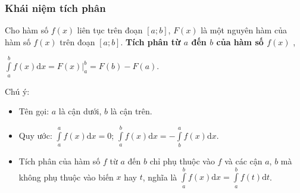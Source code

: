 \subsubsection{Khái niệm tích phân}
Cho hàm số $f(x)$ liên tục trên đoạn $\left[a;b\right]$, $F(x)$ là một nguyên hàm của hàm số $f(x)$ trên đoạn $\left[a;b\right]$. 
\textbf{\boldmath Tích phân từ $a$ đến $b$ của hàm số $f(x)$ \unboldmath},
\begin{center}
	$\displaystyle\int\limits_a^bf(x)\mathrm{d}x= F(x)\big|_a^b=F(b)-F(a)$.
\end{center}
\begin{note}Chú ý:
	\begin{itemize}
		\item Tên gọi: $a$ là cận dưới, $b$ là cận trên.
		\item Quy ước: $\displaystyle\int\limits_a^af(x)\mathrm{d}x=0$; $\displaystyle\int\limits_a^bf(x)\mathrm{d}x=-\displaystyle\int\limits_b^af(x)\mathrm{d}x$.
		\item Tích phân của hàm số $f$ từ $a$ đến $b$ chỉ phụ thuộc vào $f$ và các cận $a$, $b$ mà không phụ thuộc vào biến $x$ hay $t$, nghĩa là $\displaystyle\int\limits_a^bf(x)\mathrm{d}x=\displaystyle\int\limits_a^bf(t)\mathrm{d}t$.
	\end{itemize}
\end{note}
